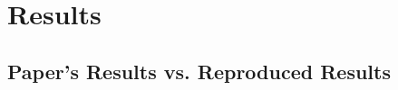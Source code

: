 \section {Results}
\subsection{Paper's Results vs. Reproduced Results}
    \begin{table}[ht]
        \centering




\end{table}
